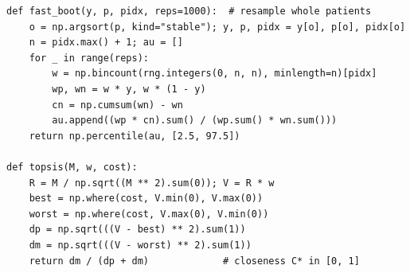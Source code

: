 \begin{lstlisting}[caption={Patient-clustered bootstrap (AUROC) and TOPSIS closeness.},label={lst:eval}]
def fast_boot(y, p, pidx, reps=1000):  # resample whole patients
    o = np.argsort(p, kind="stable"); y, p, pidx = y[o], p[o], pidx[o]
    n = pidx.max() + 1; au = []
    for _ in range(reps):
        w = np.bincount(rng.integers(0, n, n), minlength=n)[pidx]
        wp, wn = w * y, w * (1 - y)
        cn = np.cumsum(wn) - wn
        au.append((wp * cn).sum() / (wp.sum() * wn.sum()))
    return np.percentile(au, [2.5, 97.5])

def topsis(M, w, cost):
    R = M / np.sqrt((M ** 2).sum(0)); V = R * w
    best = np.where(cost, V.min(0), V.max(0))
    worst = np.where(cost, V.max(0), V.min(0))
    dp = np.sqrt(((V - best) ** 2).sum(1))
    dm = np.sqrt(((V - worst) ** 2).sum(1))
    return dm / (dp + dm)             # closeness C* in [0, 1]
\end{lstlisting}
